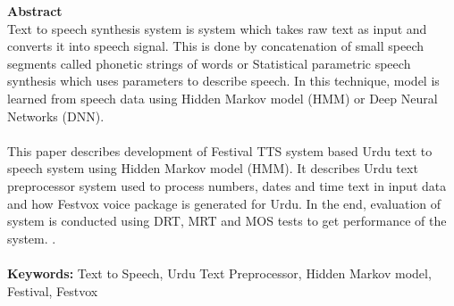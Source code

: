 
{\LARGE\textbf {Abstract}} \\ %
Text to speech synthesis system is system which takes raw text as input and converts it into speech signal.
This is done by concatenation of small speech segments called phonetic strings of words or
Statistical parametric speech synthesis which uses parameters to describe speech. In
this technique, model is learned from speech data using Hidden Markov model (HMM) or Deep Neural Networks (DNN).
\\ \\
This paper describes development of Festival TTS system based Urdu text to speech system using Hidden Markov model (HMM). It describes Urdu text preprocessor
system used to process numbers, dates and time text in input data and how Festvox voice package is generated for Urdu. In the end, evaluation of
system is conducted using DRT, MRT and MOS tests to get performance of the system.
. \\ \\
\textbf{Keywords:}
Text to Speech, Urdu Text Preprocessor, Hidden Markov model, Festival, Festvox
